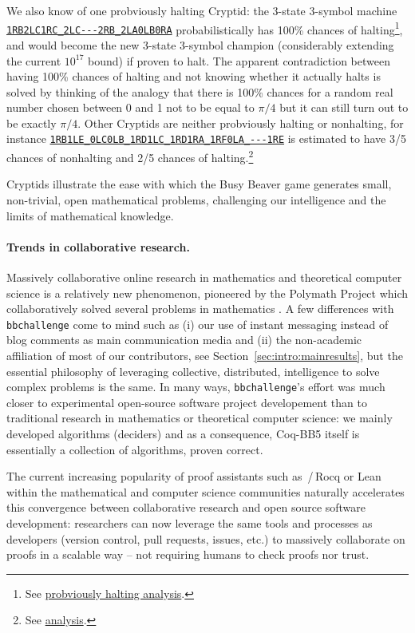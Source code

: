 \documentclass[a4paper,british]{article}
\theoremstyle{definition} %
\numberwithin{equation}{section}
\theoremstyle{definition} %
\newcommand{\tm}[1]{\href{https://bbchallenge.org/#1}{\texttt{\nolinkurl{#1}}}}
\newcommand{\CoqBB}{Coq-BB5\xspace}
\begin{document}
We also know of one probviously halting Cryptid: the 3-state 3-symbol machine \tm{1RB2LC1RC_2LC---2RB_2LA0LB0RA} probabilistically has 100\% chances of halting\footnote{See \href{https://wiki.bbchallenge.org/wiki/1RB2LC1RC_2LC---2RB_2LA0LB0RA}{probviously halting analysis}.}, and would become the new 3-state 3-symbol champion (considerably extending the current $10^{17}$ bound) if proven to halt. The apparent contradiction between having 100\% chances of halting and not knowing whether it actually halts is solved by thinking of the analogy that there is 100\% chances for a random real number chosen between 0 and 1 not to be equal to $\pi/4$ but it can still turn out to be exactly  $\pi/4$. Other Cryptids are neither probviously halting or nonhalting, for instance \tm{1RB1LE_0LC0LB_1RD1LC_1RD1RA_1RF0LA_---1RE} is estimated to have 3/5 chances of nonhalting and 2/5 chances of halting.\footnote{See \href{https://wiki.bbchallenge.org/wiki/1RB1LE_0LC0LB_1RD1LC_1RD1RA_1RF0LA_---1RE}{analysis}.}

Cryptids illustrate the ease with which the Busy Beaver game generates small, non-trivial, open mathematical problems, challenging our intelligence and the limits of mathematical knowledge.

\paragraph{Trends in collaborative research.} Massively collaborative online research in mathematics and theoretical computer science is a relatively new phenomenon, pioneered by the Polymath Project  which collaboratively solved several problems in mathematics \cite{Gowers2009}. A few differences with \texttt{bbchallenge} come to mind such as (i) our use of instant messaging instead of blog comments as main communication media and (ii) the non-academic affiliation of most of our contributors, see Section~\ref{sec:intro:mainresults}, but the essential philosophy of leveraging collective, distributed, intelligence to solve complex problems is the same. In many ways, \texttt{bbchallenge}'s effort was much closer to experimental open-source software project developement than to traditional research in mathematics or theoretical computer science: we mainly developed algorithms (deciders) and as a consequence, \CoqBB itself is essentially a collection of algorithms, proven correct.

The current increasing popularity of proof assistants such as \Coq\,/\,Rocq or Lean within the mathematical and computer science communities naturally accelerates this convergence between collaborative research and open source software development: researchers can now leverage the same tools and processes as developers (version control, pull requests, issues, etc.) to massively collaborate on proofs in a scalable way -- \ie not requiring humans to check proofs nor trust.
\end{document}
